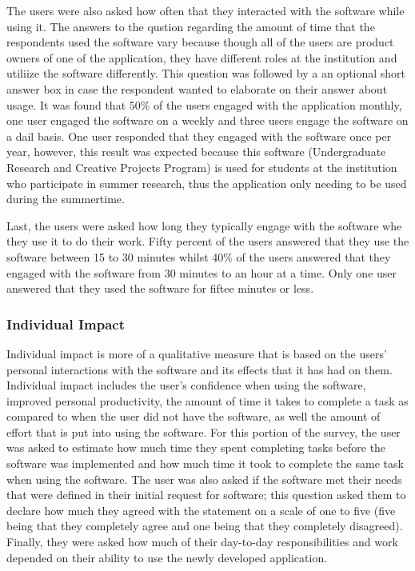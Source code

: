 The users were also asked how often that they interacted with the software while using it. The answers to the qustion regarding the amount of time that the respondents used the software vary because though all of the users are product owners of one of the application, they have different roles at the institution and utiliize the software differently. This question was followed by a an optional short answer box in case the respondent wanted to elaborate on their answer about usage. It was found that 50\% of the users engaged with the application monthly, one user engaged the software on a weekly and three users engage the software on a dail basis. One user responded that they engaged with the software once per year, however, this result was expected because this software (Undergraduate Research and Creative Projects Program) is used for students at the institution who participate in summer research, thus the application only needing to be used during the summertime.

Last, the users were asked how long they typically engage with the software whe they use it to do their work. Fifty percent of the users answered that they use the software between 15 to 30 minutes whilst 40\% of the users answered that they engaged with the software from 30 minutes to an hour at a time. Only one user answered that they used the software for fiftee minutes or less.


\subsubsection{Individual Impact}
Individual impact is more of a qualitative measure that is based on the users' personal interactions with the software and its effects that it has had on them. Individual impact includes the user's confidence when using the software, improved personal productivity, the amount of time it takes to complete a task as compared to when the user did not have the software, as well the amount of effort that is put into using the software. For this portion of the survey, the user was asked to estimate how much time they spent completing tasks before the software was implemented and how much time it took to complete the same task when using the software. The user was also asked if the software met their needs that were defined in their initial request for software; this question asked them to declare how much they agreed with the statement on a scale of one to five (five being that they completely agree and one being that they  completely disagreed). Finally, they were asked how much of their day-to-day responsibilities and work depended on their ability to use the newly developed application.


